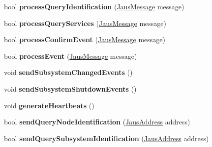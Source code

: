 \begin{DoxyCompactItemize}
\item 
\hypertarget{class_communicator_component_a93090a5b4bbf1ba9668e6b793c1b6510}{bool {\bfseries process\-Query\-Identification} (\hyperlink{struct_jaus_message_struct}{\-Jaus\-Message} message)}\label{class_communicator_component_a93090a5b4bbf1ba9668e6b793c1b6510}

\item 
\hypertarget{class_communicator_component_a4fc428747745c1b9c8ef133903ebe523}{bool {\bfseries process\-Query\-Services} (\hyperlink{struct_jaus_message_struct}{\-Jaus\-Message} message)}\label{class_communicator_component_a4fc428747745c1b9c8ef133903ebe523}

\item 
\hypertarget{class_communicator_component_a924c6e6f158cf08793923f9ab1a08678}{bool {\bfseries process\-Confirm\-Event} (\hyperlink{struct_jaus_message_struct}{\-Jaus\-Message} message)}\label{class_communicator_component_a924c6e6f158cf08793923f9ab1a08678}

\item 
\hypertarget{class_communicator_component_af2919d6f7d5de03f52afffa8ed123237}{bool {\bfseries process\-Event} (\hyperlink{struct_jaus_message_struct}{\-Jaus\-Message} message)}\label{class_communicator_component_af2919d6f7d5de03f52afffa8ed123237}

\item 
\hypertarget{class_communicator_component_aff17d08d85c46fc79a3c2e7be32c7106}{void {\bfseries send\-Subsystem\-Changed\-Events} ()}\label{class_communicator_component_aff17d08d85c46fc79a3c2e7be32c7106}

\item 
\hypertarget{class_communicator_component_a679cc63d1c764c8a3618216e90be0552}{void {\bfseries send\-Subsystem\-Shutdown\-Events} ()}\label{class_communicator_component_a679cc63d1c764c8a3618216e90be0552}

\item 
\hypertarget{class_communicator_component_ad4757236d222e551800ce861226ca5dd}{void {\bfseries generate\-Heartbeats} ()}\label{class_communicator_component_ad4757236d222e551800ce861226ca5dd}

\item 
\hypertarget{class_communicator_component_ad9178d17eb475757c944b03420a8ca82}{bool {\bfseries send\-Query\-Node\-Identification} (\hyperlink{struct_jaus_address_struct}{\-Jaus\-Address} address)}\label{class_communicator_component_ad9178d17eb475757c944b03420a8ca82}

\item 
\hypertarget{class_communicator_component_ab05c8475c5c2ae4db4ee849803fe39cb}{bool {\bfseries send\-Query\-Subsystem\-Identification} (\hyperlink{struct_jaus_address_struct}{\-Jaus\-Address} address)}\label{class_communicator_component_ab05c8475c5c2ae4db4ee849803fe39cb}


\end{DoxyCompactItemize}
